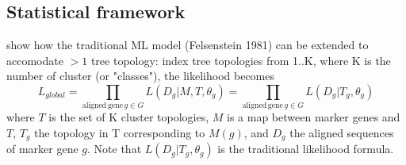 \documentclass[10pt]{bmc_article}
\newenvironment{bmcformat}{\baselineskip20pt\sloppy\setboolean{publ}{false}}{\baselineskip20pt\sloppy}
\begin{document}
\begin{bmcformat}
  \subsection*{Statistical framework}
  \begin{outline}
     \1 show how the traditional ML model (Felsenstein 1981) can be extended 
        to accomodate $>1$ tree topology: index tree topologies from 1..K, where 
        K is the number of cluster (or "classes"), the likelihood becomes
        $$ L_{global} = \prod_{\mathrm{aligned \, gene \,} g \in G} L(D_g|M, T, \theta_g )   = \prod_{\mathrm{aligned \, gene \,} g \in G} L(D_g|T_g, \theta_g ) $$
        where $T$ is the set of K cluster topologies, $M$ is a map between marker genes and $T$,
        $T_g$ the topology in T corresponding to $M(g)$, and $D_g$ the 
        aligned sequences of marker gene $g$. Note that
        $L(D_g| T_{g}, \theta_g)$ is the traditional likelihood formula.
  \end{outline}

\end{bmcformat}
\end{document}
